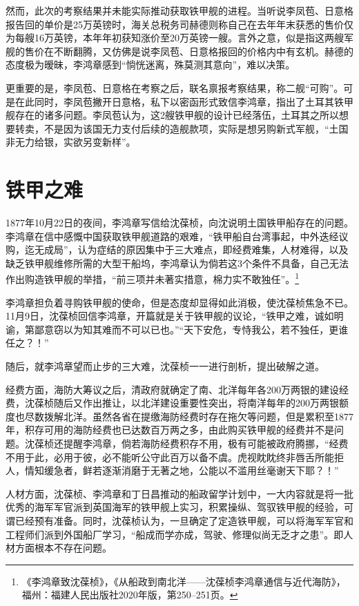 \documentclass[12pt,UTF8]{ctexbook}
\begin{document}
然而，此次的考察结果并未能实际推动获取铁甲舰的进程。当听说李凤苞、日意格报告回的单价是25万英镑时，海关总税务司赫德则称自己在去年年末获悉的售价仅为每艘16万英镑，本年年初获知涨价至20万英镑一艘。言外之意，似是指这两艘军舰的售价在不断翻腾，又仿佛是说李凤苞、日意格报回的价格内中有玄机。赫德的态度极为暧昧，李鸿章感到“惝恍迷离，殊莫测其意向”，难以决策。

更重要的是，李凤苞、日意格在考察之后，联名禀报考察结果，称二舰“可购”。可是在此同时，李凤苞撇开日意格，私下以密函形式致信李鸿章，指出了土耳其铁甲舰存在的诸多问题。李凤苞认为，这2艘铁甲舰的设计已经落伍，土耳其之所以想要转卖，不是因为该国无力支付后续的造舰款项，实际是想另购新式军舰，“土国非无力给银，实欲另变新样”。

\section{铁甲之难}

1877年10月22日的夜间，李鸿章写信给沈葆桢，向沈说明土国铁甲船存在的问题。李鸿章在信中感慨中国获取铁甲舰道路的艰难，“铁甲船自台湾事起，中外迭经议购，迄无成局”，认为症结的原因集中于三大难点，即经费难集，人材难得，以及缺乏铁甲舰维修所需的大型干船坞，李鸿章认为倘若这3个条件不具备，自己无法作出购造铁甲舰的举措，“前三项并未著实措意，棉力实不敢独任”。\footnote{《李鸿章致沈葆桢》，《从船政到南北洋——沈葆桢李鸿章通信与近代海防》，福州：福建人民出版社2020年版，第250--251页。}

李鸿章担负着寻购铁甲舰的使命，但是态度却显得如此消极，使沈葆桢焦急不已。11月9日，沈葆桢回信李鸿章，开篇就是关于铁甲舰的议论，“铁甲之难，诚如明谕，第鄙意窃以为知其难而不可以已也。”“天下安危，专恃我公，若不独任，更谁任之？！”

随后，就李鸿章望而止步的三大难，沈葆桢一一进行剖析，提出破解之道。

经费方面，海防大筹议之后，清政府就确定了南、北洋每年各200万两银的建设经费，沈葆桢随后又作出推让，以北洋建设重要性突出，将南洋每年的200万两银额度也尽数拨解北洋。虽然各省在提缴海防经费时存在拖欠等问题，但是累积至1877年，积存可用的海防经费也已达数百万两之多，由此购买铁甲舰的经费并不是问题。沈葆桢还提醒李鸿章，倘若海防经费积存不用，极有可能被政府腾挪，“经费不用于此，必用于彼，必不能听公守此百万以备不虞。虎视眈眈终非唇舌所能拒人，情知缓急者，鲜若逐渐消磨于无著之地，公能以不滥用丝毫谢天下耶？！”

人材方面，沈葆桢、李鸿章和丁日昌推动的船政留学计划中，一大内容就是将一批优秀的海军军官派到英国海军的铁甲舰上实习，积累操纵、驾驭铁甲舰的经验，可谓已经预有准备。同时，沈葆桢认为，一旦确定了定造铁甲舰，可以将海军军官和工程师们派到外国船厂学习，“船成而学亦成，驾驶、修理似尚无乏才之患”。即人材方面根本不存在问题。
\end{document}
